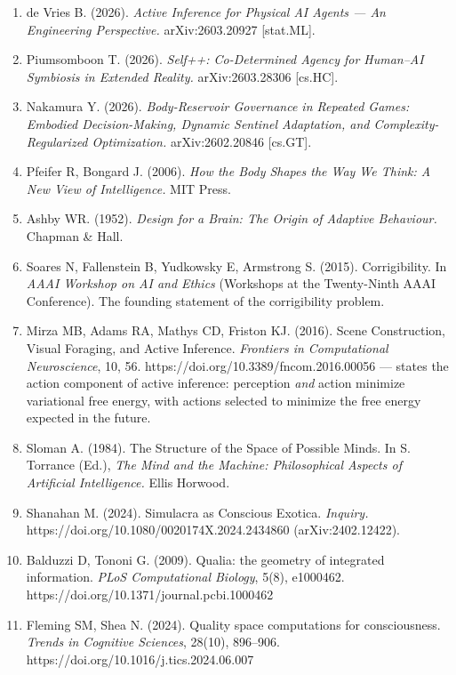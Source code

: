 \documentclass[
]{article}
\begin{document}
\begin{enumerate}
  neural networks. \emph{Nature Communications}, 13, 7742.
  https://doi.org/10.1038/s41467-022-34938-7
\item
  de Vries B. (2026). \emph{Active Inference for Physical AI Agents ---
  An Engineering Perspective.} arXiv:2603.20927 {[}stat.ML{]}.
\item
  Piumsomboon T. (2026). \emph{Self++: Co-Determined Agency for
  Human--AI Symbiosis in Extended Reality.} arXiv:2603.28306
  {[}cs.HC{]}.
\item
  Nakamura Y. (2026). \emph{Body-Reservoir Governance in Repeated Games:
  Embodied Decision-Making, Dynamic Sentinel Adaptation, and
  Complexity-Regularized Optimization.} arXiv:2602.20846 {[}cs.GT{]}.
\item
  Pfeifer R, Bongard J. (2006). \emph{How the Body Shapes the Way We
  Think: A New View of Intelligence.} MIT Press.
\item
  Ashby WR. (1952). \emph{Design for a Brain: The Origin of Adaptive
  Behaviour.} Chapman \& Hall.
\item
  Soares N, Fallenstein B, Yudkowsky E, Armstrong S. (2015).
  Corrigibility. In \emph{AAAI Workshop on AI and Ethics} (Workshops at
  the Twenty-Ninth AAAI Conference). The founding statement of the
  corrigibility problem.
\item
  Mirza MB, Adams RA, Mathys CD, Friston KJ. (2016). Scene Construction,
  Visual Foraging, and Active Inference. \emph{Frontiers in
  Computational Neuroscience}, 10, 56.
  https://doi.org/10.3389/fncom.2016.00056 --- states the action
  component of active inference: perception \emph{and} action minimize
  variational free energy, with actions selected to minimize the free
  energy expected in the future.
\item
  Sloman A. (1984). The Structure of the Space of Possible Minds. In S.
  Torrance (Ed.), \emph{The Mind and the Machine: Philosophical Aspects
  of Artificial Intelligence.} Ellis Horwood.
\item
  Shanahan M. (2024). Simulacra as Conscious Exotica. \emph{Inquiry.}
  https://doi.org/10.1080/0020174X.2024.2434860 (arXiv:2402.12422).
\item
  Balduzzi D, Tononi G. (2009). Qualia: the geometry of integrated
  information. \emph{PLoS Computational Biology}, 5(8), e1000462.
  https://doi.org/10.1371/journal.pcbi.1000462
\item
  Fleming SM, Shea N. (2024). Quality space computations for
  consciousness. \emph{Trends in Cognitive Sciences}, 28(10), 896--906.
  https://doi.org/10.1016/j.tics.2024.06.007

\end{enumerate}
\end{document}
